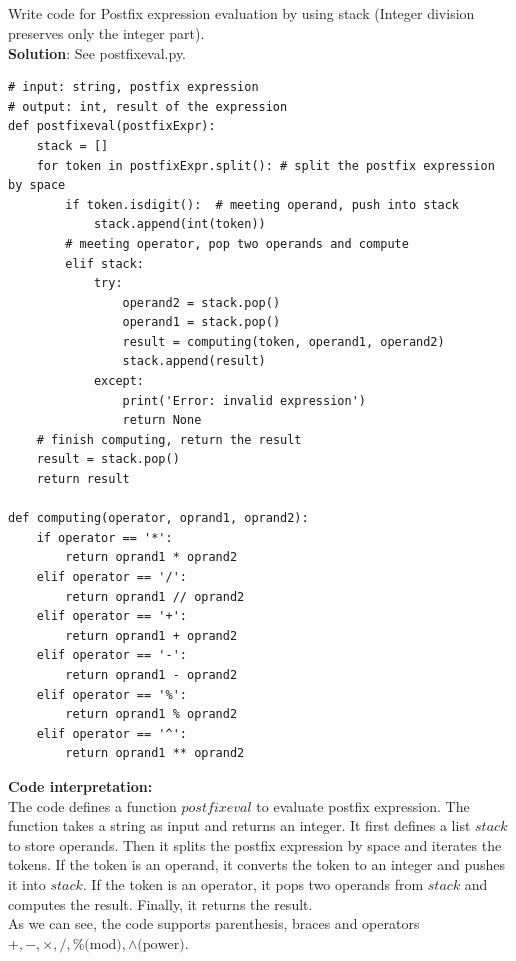 \documentclass[UTF8]{ctexart}
\begin{document}
\subsection{}
Write code for Postfix expression evaluation by using stack (Integer division
preserves only the integer part).\\
\textbf{Solution}: See postfixeval.py.
\begin{lstlisting}
# input: string, postfix expression
# output: int, result of the expression
def postfixeval(postfixExpr):
    stack = []
    for token in postfixExpr.split(): # split the postfix expression by space
        if token.isdigit():  # meeting operand, push into stack
            stack.append(int(token))
        # meeting operator, pop two operands and compute
        elif stack:
            try:
                operand2 = stack.pop()
                operand1 = stack.pop()
                result = computing(token, operand1, operand2)
                stack.append(result)
            except:
                print('Error: invalid expression')
                return None
    # finish computing, return the result
    result = stack.pop()
    return result

def computing(operator, oprand1, oprand2):
    if operator == '*':
        return oprand1 * oprand2
    elif operator == '/':
        return oprand1 // oprand2
    elif operator == '+':
        return oprand1 + oprand2
    elif operator == '-':
        return oprand1 - oprand2
    elif operator == '%':
        return oprand1 % oprand2
    elif operator == '^':
        return oprand1 ** oprand2
\end{lstlisting}
\textbf{Code interpretation:} \\
The code defines a function $postfixeval$ to evaluate postfix expression. The function takes a string as input and returns an integer.
It first defines a list $stack$ to store operands. Then it splits the postfix expression by space and iterates the tokens. 
If the token is an operand, it converts the token to an integer and pushes it into $stack$. 
If the token is an operator, it pops two operands from $stack$ and computes the result.
Finally, it returns the result.\\
As we can see, the code supports parenthesis, braces and operators $+, -, \times, /, \% \text{(mod)},\wedge \text{(power)} $.\\
\end{document}
